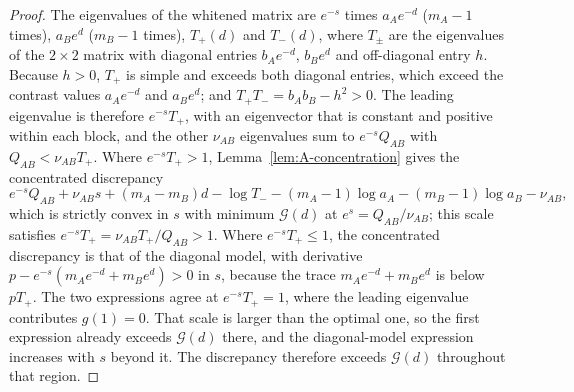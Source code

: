 \begin{proof}
The eigenvalues of the whitened matrix are $e^{-s}$ times $a_Ae^{-d}$ ($m_A-1$ times), $a_Be^{d}$ ($m_B-1$ times), $T_+(d)$ and $T_-(d)$, where $T_\pm$ are the eigenvalues of the $2\times2$ matrix with diagonal entries $b_Ae^{-d}$, $b_Be^{d}$ and off-diagonal entry $h$. Because $h>0$, $T_+$ is simple and exceeds both diagonal entries, which exceed the contrast values $a_Ae^{-d}$ and $a_Be^{d}$; and $T_+T_-=b_Ab_B-h^2>0$. The leading eigenvalue is therefore $e^{-s}T_+$, with an eigenvector that is constant and positive within each block, and the other $\nu_{AB}$ eigenvalues sum to $e^{-s}Q_{AB}$ with $Q_{AB}<\nu_{AB}T_+$. Where $e^{-s}T_+>1$, Lemma~\ref{lem:A-concentration} gives the concentrated discrepancy
\[
e^{-s}Q_{AB}+\nu_{AB}s+(m_A-m_B)d-\log T_--(m_A-1)\log a_A-(m_B-1)\log a_B-\nu_{AB},
\]
which is strictly convex in $s$ with minimum $\mathcal G(d)$ at $e^s=Q_{AB}/\nu_{AB}$; this scale satisfies $e^{-s}T_+=\nu_{AB}T_+/Q_{AB}>1$. Where $e^{-s}T_+\le1$, the concentrated discrepancy is that of the diagonal model, with derivative $p-e^{-s}(m_Ae^{-d}+m_Be^{d})>0$ in $s$, because the trace $m_Ae^{-d}+m_Be^{d}$ is below $pT_+$. The two expressions agree at $e^{-s}T_+=1$, where the leading eigenvalue contributes $g(1)=0$. That scale is larger than the optimal one, so the first expression already exceeds $\mathcal G(d)$ there, and the diagonal-model expression increases with $s$ beyond it. The discrepancy therefore exceeds $\mathcal G(d)$ throughout that region.
\end{proof}

